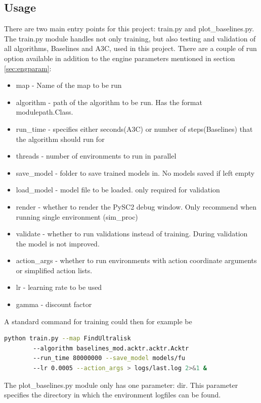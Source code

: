 \subsection{Usage}
There are two main entry points for this project: train.py and plot\_baselines.py.
The train.py module handles not only training, but also testing and validation of all algorithms, Baselines and A3C, used in this project. There are a couple of run option available in addition to the engine parameters mentioned in section \ref{sec:engparam}:
\begin{itemize}
\item map - Name of the map to be run
\item algorithm - path of the algorithm to be run. Has the format modulepath.Class.
\item run\_time - specifies either seconds(A3C) or number of steps(Baselines) that the algorithm should run for
\item threads - number of environments to run in parallel
\item save\_model - folder to save trained models in. No models saved if left empty
\item load\_model - model file to be loaded. only required for validation
\item render - whether to render the PySC2 debug window. Only recommend when running single environment (sim\_proc)
\item validate - whether to run validations instead of training. During validation the  model is not improved.
\item action\_args - whether to run environments with action coordinate arguments or simplified action lists.
\item lr - learning rate to be used
\item gamma - discount factor
\end{itemize}

A standard command for training could then for example be

\begin{lstlisting}[language=bash]
	python train.py --map FindUltralisk
    	--algorithm baselines_mod.acktr.acktr.Acktr
    	--run_time 80000000 --save_model models/fu
        --lr 0.0005 --action_args > logs/last.log 2>&1 &
\end{lstlisting}

The plot\_baselines.py module only has one parameter: dir. This parameter specifies the directory in which the environment logfiles can be found.

